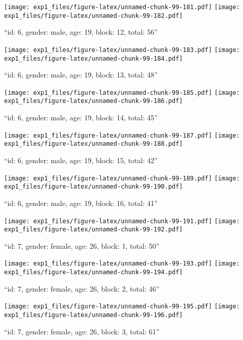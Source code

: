 \documentclass[,]{article}
\begin{document}
\texttt{[image: exp1\_files/figure-latex/unnamed-chunk-99-181.pdf]}
\texttt{[image: exp1\_files/figure-latex/unnamed-chunk-99-182.pdf]}

\newpage
[1] 

``id: 6, gender: male, age: 19, block: 12, total: 56''

\texttt{[image: exp1\_files/figure-latex/unnamed-chunk-99-183.pdf]}
\texttt{[image: exp1\_files/figure-latex/unnamed-chunk-99-184.pdf]}

\newpage
[1] 

``id: 6, gender: male, age: 19, block: 13, total: 48''

\texttt{[image: exp1\_files/figure-latex/unnamed-chunk-99-185.pdf]}
\texttt{[image: exp1\_files/figure-latex/unnamed-chunk-99-186.pdf]}

\newpage
[1] 

``id: 6, gender: male, age: 19, block: 14, total: 45''

\texttt{[image: exp1\_files/figure-latex/unnamed-chunk-99-187.pdf]}
\texttt{[image: exp1\_files/figure-latex/unnamed-chunk-99-188.pdf]}

\newpage
[1] 

``id: 6, gender: male, age: 19, block: 15, total: 42''

\texttt{[image: exp1\_files/figure-latex/unnamed-chunk-99-189.pdf]}
\texttt{[image: exp1\_files/figure-latex/unnamed-chunk-99-190.pdf]}

\newpage
[1] 

``id: 6, gender: male, age: 19, block: 16, total: 41''

\texttt{[image: exp1\_files/figure-latex/unnamed-chunk-99-191.pdf]}
\texttt{[image: exp1\_files/figure-latex/unnamed-chunk-99-192.pdf]}

\newpage
[1] 

``id: 7, gender: female, age: 26, block: 1, total: 50''

\texttt{[image: exp1\_files/figure-latex/unnamed-chunk-99-193.pdf]}
\texttt{[image: exp1\_files/figure-latex/unnamed-chunk-99-194.pdf]}

\newpage
[1] 

``id: 7, gender: female, age: 26, block: 2, total: 46''

\texttt{[image: exp1\_files/figure-latex/unnamed-chunk-99-195.pdf]}
\texttt{[image: exp1\_files/figure-latex/unnamed-chunk-99-196.pdf]}

\newpage
[1] 

``id: 7, gender: female, age: 26, block: 3, total: 61''
\end{document}
